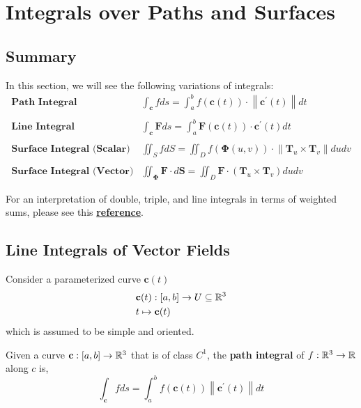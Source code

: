 \section{Integrals over Paths and Surfaces}
\subsection{Summary}
In this section, we will see the following variations of integrals:
\[
\begin{array}{l|l}
\textbf {Path Integral} & \int_{\mathbf{c}} f d s=\int_a^b f(\mathbf{c}(t)) \cdot\left\|\mathbf{c}^{\prime}(t)\right\| d t \\
\\
\textbf {Line Integral} & \int_{\mathbf{c}} \mathbf{F} d s=\int_a^b \mathbf{F}(\mathbf{c}(t)) \cdot \mathbf{c}^{\prime}(t) d t \\
\\
\textbf {Surface Integral (Scalar)} & \iint_S f d S = \iint_D f(\mathbf{\Phi}(u, v)) \cdot\left\|\mathbf{T}_u \times \mathbf{T}_v\right\| d u d v \\
\\
\textbf {Surface Integral (Vector)} & \iint_{\mathbf{\Phi}} \mathbf{F} \cdot d \mathbf{S}=\iint_D \mathbf{F} \cdot\left(\mathbf{T}_u \times \mathbf{T}_v\right) d u d v
\end{array}
\]

\begin{marginfigure}
	For an interpretation of double, triple, and line integrals in terms of weighted sums, please see this \href{https://www.math.ucla.edu/~josephbreen/Line_and_Surface_Integrals.pdf}{\textbf{reference}}.
\end{marginfigure}

\subsection{Line Integrals of Vector Fields}
Consider a parameterized curve $\mathbf{c}(t)$
\begin{align*}
	&\mathbf{c}(t): [a, b] \rightarrow U \subseteq \mathbb{R}^3 \\
	&t \mapsto \mathbf{c}(t)
\end{align*}
which is assumed to be simple and oriented.

\hfill

\begin{defn}
	\sloppy Given a curve $\mathbf{c}: [a,b] \rightarrow \mathbb{R}^3$ that is of class $C^1$, the \textbf{path integral} of $f: \mathbb{R}^3 \rightarrow \mathbb{R}$ along $c$ is,
	\[\int_{\mathbf{c}} f d s = \int_a^b f(\mathbf{c}(t))\left\|\mathbf{c}^{\prime}(t)\right\| d t\]
\end{defn}

